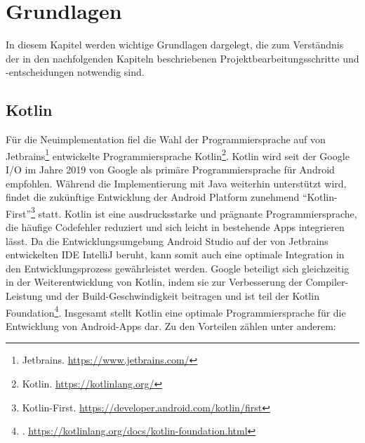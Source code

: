 \chapter{Grundlagen}\label{ch:grundlagen}

In diesem Kapitel werden wichtige Grundlagen dargelegt, die zum Verständnis der in den nachfolgenden Kapiteln beschriebenen Projektbearbeitungsschritte und -entscheidungen notwendig sind.

\section{Kotlin}\label{sec:kotlin}

Für die Neuimplementation fiel die Wahl der Programmiersprache auf von Jetbrains\footnote{Jetbrains. \url{https://www.jetbrains.com/}} entwickelte Programmiersprache Kotlin\footnote{Kotlin. \url{https://kotlinlang.org/}}. Kotlin wird seit der Google I/O im Jahre 2019 von Google als primäre Programmiersprache für Android empfohlen. Während die Implementierung mit Java weiterhin unterstützt wird, findet die zukünftige Entwicklung der Android Platform zunehmend \enquote{Kotlin-First}\footnote{Kotlin-First. \url{https://developer.android.com/kotlin/first}} statt. Kotlin ist eine ausdrucksstarke und prägnante Programmiersprache, die häufige Codefehler reduziert und sich leicht in bestehende Apps integrieren lässt. Da die Entwicklungsumgebung Android Studio auf der von Jetbrains entwickelten IDE IntelliJ beruht, kann somit auch eine optimale Integration in den Entwicklungsprozess gewährleistet werden. Google beteiligt sich gleichzeitig in der Weiterentwicklung von Kotlin, indem sie zur Verbesserung der Compiler-Leistung und der Build-Geschwindigkeit beitragen und ist teil der Kotlin Foundation\footnote{. \url{https://kotlinlang.org/docs/kotlin-foundation.html}}. Insgesamt stellt Kotlin eine optimale Programmiersprache für die Entwicklung von Android-Apps dar. Zu den Vorteilen zählen unter anderem:   

